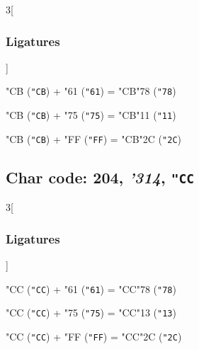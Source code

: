 \documentclass{article}
\newlength{\maxcharwidth}
\begin{document}
\begin{multicols}{3}[\subsubsection{Ligatures}]

{\testfont\char"CB\noboundary} ({\tt"CB}) + {\testfont\char"61\noboundary} ({\tt"61}) = {\testfont\char"CB\noboundary}{\testfont\char"78\noboundary} ({\tt"78}) 

{\testfont\char"CB\noboundary} ({\tt"CB}) + {\testfont\char"75\noboundary} ({\tt"75}) = {\testfont\char"CB\noboundary}{\testfont\char"11\noboundary} ({\tt"11}) 

{\testfont\char"CB\noboundary} ({\tt"CB}) + {\testfont\char"FF\noboundary} ({\tt"FF}) = {\testfont\char"CB\noboundary}{\testfont\char"2C\noboundary} ({\tt"2C}) 

\end{multicols}

\subsection{Char code: 204, {\it'314}, {\tt"CC}}
\label{char_204}


\begin{multicols}{3}[\subsubsection{Ligatures}]

{\testfont\char"CC\noboundary} ({\tt"CC}) + {\testfont\char"61\noboundary} ({\tt"61}) = {\testfont\char"CC\noboundary}{\testfont\char"78\noboundary} ({\tt"78}) 

{\testfont\char"CC\noboundary} ({\tt"CC}) + {\testfont\char"75\noboundary} ({\tt"75}) = {\testfont\char"CC\noboundary}{\testfont\char"13\noboundary} ({\tt"13}) 

{\testfont\char"CC\noboundary} ({\tt"CC}) + {\testfont\char"FF\noboundary} ({\tt"FF}) = {\testfont\char"CC\noboundary}{\testfont\char"2C\noboundary} ({\tt"2C}) 

\end{multicols}
\end{document}
